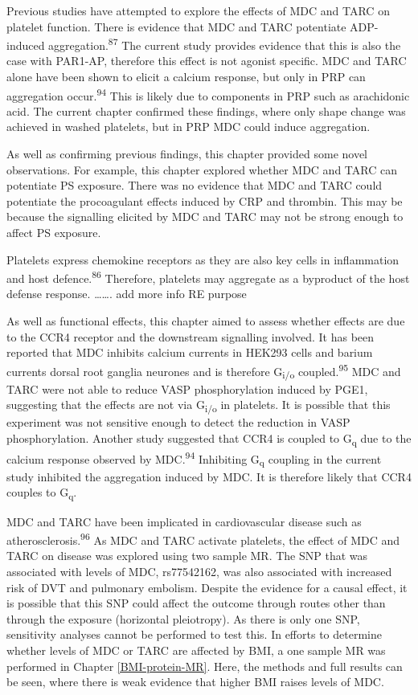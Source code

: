 \documentclass[11pt,twoside]{bristolthesis}
\begin{document}
Previous studies have attempted to explore the effects of MDC and TARC on platelet function. There is evidence that MDC and TARC potentiate ADP-induced aggregation.\textsuperscript{87} The current study provides evidence that this is also the case with PAR1-AP, therefore this effect is not agonist specific. MDC and TARC alone have been shown to elicit a calcium response, but only in PRP can aggregation occur.\textsuperscript{94} This is likely due to components in PRP such as arachidonic acid. The current chapter confirmed these findings, where only shape change was achieved in washed platelets, but in PRP MDC could induce aggregation.

As well as confirming previous findings, this chapter provided some novel observations. For example, this chapter explored whether MDC and TARC can potentiate PS exposure. There was no evidence that MDC and TARC could potentiate the procoagulant effects induced by CRP and thrombin. This may be because the signalling elicited by MDC and TARC may not be strong enough to affect PS exposure.

Platelets express chemokine receptors as they are also key cells in inflammation and host defence.\textsuperscript{86} Therefore, platelets may aggregate as a byproduct of the host defense response. \ldots\ldots. add more info RE purpose

As well as functional effects, this chapter aimed to assess whether effects are due to the CCR4 receptor and the downstream signalling involved. It has been reported that MDC inhibits calcium currents in HEK293 cells and barium currents dorsal root ganglia neurones and is therefore G\textsubscript{i/o} coupled.\textsuperscript{95} MDC and TARC were not able to reduce VASP phosphorylation induced by PGE1, suggesting that the effects are not via G\textsubscript{i/o} in platelets. It is possible that this experiment was not sensitive enough to detect the reduction in VASP phosphorylation. Another study suggested that CCR4 is coupled to G\textsubscript{q} due to the calcium response observed by MDC.\textsuperscript{94} Inhibiting G\textsubscript{q} coupling in the current study inhibited the aggregation induced by MDC. It is therefore likely that CCR4 couples to G\textsubscript{q}.

MDC and TARC have been implicated in cardiovascular disease such as atherosclerosis.\textsuperscript{96} As MDC and TARC activate platelets, the effect of MDC and TARC on disease was explored using two sample MR. The SNP that was associated with levels of MDC, rs77542162, was also associated with increased risk of DVT and pulmonary embolism. Despite the evidence for a causal effect, it is possible that this SNP could affect the outcome through routes other than through the exposure (horizontal pleiotropy). As there is only one SNP, sensitivity analyses cannot be performed to test this. In efforts to determine whether levels of MDC or TARC are affected by BMI, a one sample MR was performed in Chapter \ref{BMI-protein-MR}. Here, the methods and full results can be seen, where there is weak evidence that higher BMI raises levels of MDC.
\end{document}
